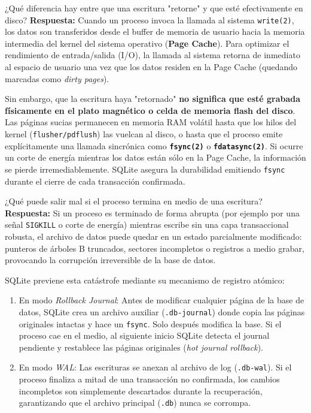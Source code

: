 \documentclass[10pt,a4paper]{article}
\begin{document}
\begin{pregunta}{¿Qué diferencia hay entre que una escritura "retorne" y que esté efectivamente en disco?}
    \textbf{Respuesta:} Cuando un proceso invoca la llamada al sistema \texttt{write(2)}, los datos son transferidos desde el buffer de memoria de usuario hacia la memoria intermedia del kernel del sistema operativo (\textbf{Page Cache}). Para optimizar el rendimiento de entrada/salida (I/O), la llamada al sistema retorna de inmediato al espacio de usuario una vez que los datos residen en la Page Cache (quedando marcadas como \textit{dirty pages}).
    
    Sin embargo, que la escritura haya "retornado" \textbf{no significa que esté grabada físicamente en el plato magnético o celda de memoria flash del disco}. Las páginas sucias permanecen en memoria RAM volátil hasta que los hilos del kernel (\texttt{flusher/pdflush}) las vuelcan al disco, o hasta que el proceso emite explícitamente una llamada sincrónica como \textbf{\texttt{fsync(2)}} o \textbf{\texttt{fdatasync(2)}}. Si ocurre un corte de energía mientras los datos están sólo en la Page Cache, la información se pierde irremediablemente. SQLite asegura la durabilidad emitiendo \texttt{fsync} durante el cierre de cada transacción confirmada.
\end{pregunta}

\begin{pregunta}{¿Qué puede salir mal si el proceso termina en medio de una escritura?}
    \textbf{Respuesta:} Si un proceso es terminado de forma abrupta (por ejemplo por una señal \texttt{SIGKILL} o corte de energía) mientras escribe sin una capa transaccional robusta, el archivo de datos puede quedar en un estado parcialmente modificado: punteros de árboles B truncados, sectores incompletos o registros a medio grabar, provocando la corrupción irreversible de la base de datos.
    
    SQLite previene esta catástrofe mediante su mecanismo de registro atómico:
    \begin{enumerate}[leftmargin=*]
        \item En modo \textit{Rollback Journal}: Antes de modificar cualquier página de la base de datos, SQLite crea un archivo auxiliar (\texttt{.db-journal}) donde copia las páginas originales intactas y hace un \texttt{fsync}. Solo después modifica la base. Si el proceso cae en el medio, al siguiente inicio SQLite detecta el journal pendiente y restablece las páginas originales (\textit{hot journal rollback}).
        \item En modo \textit{WAL}: Las escrituras se anexan al archivo de log (\texttt{.db-wal}). Si el proceso finaliza a mitad de una transacción no confirmada, los cambios incompletos son simplemente descartados durante la recuperación, garantizando que el archivo principal (\texttt{.db}) nunca se corrompa.
    \end{enumerate}
\end{pregunta}
\end{document}
